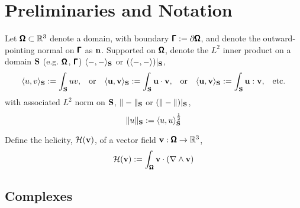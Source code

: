 \section*{Preliminaries and Notation}

    Let $\pmb{\mathsf{\Omega}}  \subset  \mathbb{R}^{3}$ denote a  domain, with boundary $\pmb{\mathsf{\Gamma}}  :=  \partial\pmb{\mathsf{\Omega}}$, and denote the outward-pointing normal on $\pmb{\mathsf{\Gamma}}$ as $\mathbf{n}$. Supported on $\pmb{\mathsf{\Omega}}$, denote the $L^{2}$ inner product on a domain $\mathbf{S}$ (e.g. $\pmb{\mathsf{\Omega}}$, $\pmb{\mathsf{\Gamma}}$) $\langle-, -\rangle_{\mathbf{S}}$ or $(\langle-, -\rangle)|_{\mathbf{S}}$,
    \begin{align}
        \langle u, v\rangle_{\mathbf{S}}  :=  \int_{\mathbf{S}}uv,  &&
        \text{or}  &&
        \langle \mathbf{u}, \mathbf{v}\rangle_{\mathbf{S}}  :=  \int_{\mathbf{S}}\mathbf{u}\cdot\mathbf{v},  &&
        \text{or}  &&
        \langle \mathbf{u}, \mathbf{v}\rangle_{\mathbf{S}}  :=  \int_{\mathbf{S}}\mathbf{u}:\mathbf{v},  &&
        \text{etc.}
    \end{align}
    with associated $L^{2}$ norm on $\mathbf{S}$, $\|-\|_{\mathbf{S}}$ or $(\|-\|)|_{\mathbf{S}}$,
    \begin{equation}
        \|u\|_{\mathbf{S}}  :=  \langle u, u\rangle_{\mathbf{S}}^{\frac{1}{2}}
    \end{equation}
    
    Define the helicity, $\mathcal{H}(\mathbf{v})$, of a vector field $\mathbf{v} : \pmb{\mathsf{\Omega}} \rightarrow \mathbb{R}^{3}$, 
    \begin{equation}
        \mathcal{H}(\mathbf{v})  :=  \int_{\pmb{\mathsf{\Omega}}}\mathbf{v}\cdot(\nabla\wedge\mathbf{v})
    \end{equation}
    
    \subsection*{Complexes}

